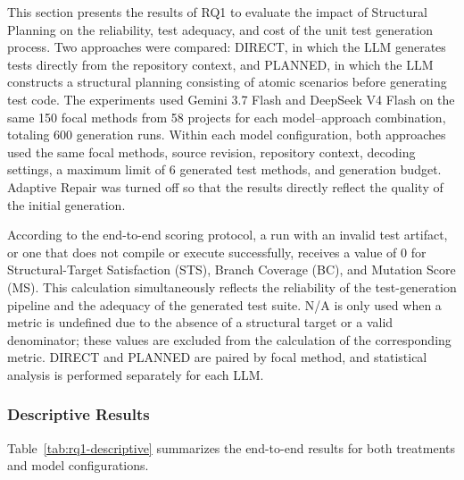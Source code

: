 \documentclass[pdflatex,sn-basic,Numbered,iicol]{sn-jnl}
\begin{document}
This section presents the results of RQ1 to evaluate the impact of Structural Planning on the reliability, test adequacy, and cost of the unit test generation process. Two approaches were compared: DIRECT, in which the LLM generates tests directly from the repository context, and PLANNED, in which the LLM constructs a structural planning consisting of atomic scenarios before generating test code. The experiments used Gemini 3.7 Flash and DeepSeek V4 Flash on the same 150 focal methods from 58 projects for each model--approach combination, totaling 600 generation runs. Within each model configuration, both approaches used the same focal methods, source revision, repository context, decoding settings, a maximum limit of 6 generated test methods, and generation budget. Adaptive Repair was turned off so that the results directly reflect the quality of the initial generation.

According to the end-to-end scoring protocol, a run with an invalid test artifact, or one that does not compile or execute successfully, receives a value of 0 for Structural-Target Satisfaction (STS), Branch Coverage (BC), and Mutation Score (MS). This calculation simultaneously reflects the reliability of the test-generation pipeline and the adequacy of the generated test suite. N/A is only used when a metric is undefined due to the absence of a structural target or a valid denominator; these values are excluded from the calculation of the corresponding metric. DIRECT and PLANNED are paired by focal method, and statistical analysis is performed separately for each LLM.

\subsubsection{Descriptive Results}\label{subsubsec:rq1-descriptive}

Table~\ref{tab:rq1-descriptive} summarizes the end-to-end results for both treatments and model configurations.
\end{document}
